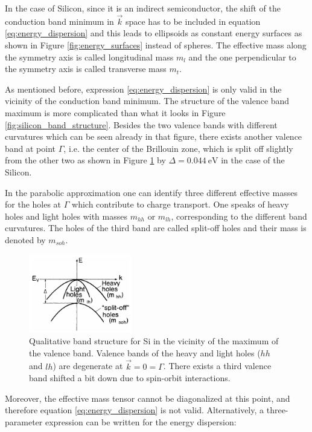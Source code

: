 \documentclass[11pt,a4paper]{article}
\begin{document}
In the case of Silicon, since it is an indirect semiconductor, the shift of the conduction band minimum in $\vec{k}$ space has to be included in equation \eqref{eq:energy_dispersion} and this leads to ellipsoids as constant energy surfaces as shown in Figure \ref{fig:energy_surfaces} instead of spheres. The effective mass along the symmetry axis is called longitudinal mass $m_l$ and the one perpendicular to the symmetry axis is called transverse mass $m_t$.

As mentioned before, expression \eqref{eq:energy_dispersion} is only valid in the vicinity of the conduction band minimum. The structure of the valence band maximum is more complicated than what it looks in Figure \ref{fig:silicon_band_structure}. Besides the two valence bands with different curvatures which can be seen already in that figure, there exists another valence band at point $\Gamma$, i.e. the center of the Brillouin zone, which is split off slightly from the other two as shown in Figure \ref{fig:light_heavy_holes} by $\Delta = \SI{0.044}{\electronvolt}$ in the case of the Silicon.

In the parabolic approximation one can identify three different effective masses for the holes at $\Gamma$ which contribute to charge transport. One speaks of heavy holes and light holes with masses $m_{hh}$ or $m_{lh}$, corresponding to the different band curvatures. The holes of the third band are called split-off holes and their mass is denoted by $m_{soh}$.

\begin{figure}[ht]
\centering
\includegraphics[width=0.4\textwidth]{light_heavy_holes}
\caption{Qualitative band structure for Si in the vicinity of the maximum of the valence band. Valence bands of the heavy and light holes ($hh$ and $lh$) are degenerate at $\vec{k}=0=\Gamma$. There exists a third valence band shifted a bit down due to spin-orbit interactions.\cite{ibach2009solid}}
\label{fig:light_heavy_holes}
\end{figure}

Moreover, the effective mass tensor cannot be diagonalized at this point, and therefore equation \eqref{eq:energy_dispersion} is not valid. Alternatively, a three-parameter expression can be written for the energy dispersion:
\end{document}
